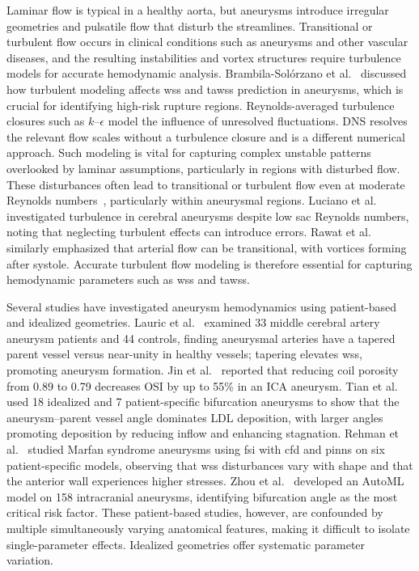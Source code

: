 \documentclass[12pt,a4paper]{article}
\newcommand{\cfdrevision}[1]{#1} %
\newcommand{\CFD}{\ac{cfd}\xspace}
\newcommand{\FSI}{\ac{fsi}\xspace}
\newcommand{\PINNs}{\acp{pinn}\xspace}
\newcommand{\WSS}{\ac{wss}\xspace}
\newcommand{\TAWSS}{\ac{tawss}\xspace}
\newcommand{\OSI}{\ac{OSI}\xspace}
\newcommand{\ICA}{\ac{ICA}\xspace}
\newcommand{\DNS}{\ac{DNS}\xspace}
\newcommand{\LDL}{\ac{LDL}\xspace}
\theoremstyle{definition}
\numberwithin{equation}{section}
\providecommand{\DIFaddtex}[1]{{\protect\color{blue} \sf #1}} %
\providecommand{\DIFdeltex}[1]{{\protect\color{red} \scriptsize #1}} %
\providecommand{\DIFaddbegin}{} %
\providecommand{\DIFaddend}{} %
\providecommand{\DIFdelbegin}{} %
\providecommand{\DIFdelend}{} %
\providecommand{\DIFadd}[1]{\texorpdfstring{\DIFaddtex{#1}}{#1}} %
\providecommand{\DIFdel}[1]{\texorpdfstring{\DIFdeltex{#1}}{}} %
\newcommand{\DIFscaledelfig}{0.5}
\newlength{\DIFdelgraphicswidth} %
\newlength{\DIFdelgraphicsheight} %
\newcommand{\DIFaddincludegraphics}[2][]{{\color{blue}\fbox{\DIFOincludegraphics[#1]{#2}}}} %
\newcommand{\DIFdelincludegraphics}[2][]{%
\sbox{\DIFdelgraphicsbox}{\DIFOincludegraphics[#1]{#2}}%
\settoboxwidth{\DIFdelgraphicswidth}{\DIFdelgraphicsbox} %
\settoboxtotalheight{\DIFdelgraphicsheight}{\DIFdelgraphicsbox} %
\scalebox{\DIFscaledelfig}{%
\parbox[b]{\DIFdelgraphicswidth}{\usebox{\DIFdelgraphicsbox}\\[-\baselineskip] \rule{\DIFdelgraphicswidth}{0em}}\llap{\resizebox{\DIFdelgraphicswidth}{\DIFdelgraphicsheight}{%
\setlength{\unitlength}{\DIFdelgraphicswidth}%
\begin{picture}(1,1)%
\thicklines\linethickness{2pt} %
{\color[rgb]{1,0,0}\put(0,0){\framebox(1,1){}}}%
{\color[rgb]{1,0,0}\put(0,0){\line( 1,1){1}}}%
{\color[rgb]{1,0,0}\put(0,1){\line(1,-1){1}}}%
\end{picture}%
}\hspace*{3pt}}} %
} %
\DeclareRobustCommand{\DIFaddbegin}{\DIFOaddbegin \let\includegraphics\DIFaddincludegraphics} %
\DeclareRobustCommand{\DIFaddend}{\DIFOaddend \let\includegraphics\DIFOincludegraphics} %
\DeclareRobustCommand{\DIFdelbegin}{\DIFOdelbegin \let\includegraphics\DIFdelincludegraphics} %
\DeclareRobustCommand{\DIFdelend}{\DIFOaddend \let\includegraphics\DIFOincludegraphics} %
\renewcommand{\DIFaddtex}[1]{{\protect\color{red}#1}}
\renewcommand{\DIFdeltex}[1]{}
\renewcommand{\DIFdel}[1]{}
\renewcommand{\DIFaddincludegraphics}[2][]{\DIFOincludegraphics[#1]{#2}}
\renewcommand{\DIFdelincludegraphics}[2][]{}
\renewcommand{\cfdrevision}[1]{\textcolor{red}{#1}}
\def\DIFaddbegin{}\def\DIFaddend{}%
\def\DIFdelbegin{}\def\DIFdelend{}%
\def\cfdrevision#1{#1}%
\begin{document}
Laminar flow is typical in a healthy aorta, but aneurysms introduce irregular geometries and pulsatile flow that disturb the streamlines. Transitional or turbulent flow occurs in clinical conditions such as aneurysms and other vascular diseases, and the resulting instabilities and vortex structures require turbulence models for accurate hemodynamic analysis. Brambila-Solórzano et al.~\cite{brambila2023influence} discussed how turbulent modeling affects \WSS and \TAWSS prediction in aneurysms, which is crucial for identifying high-risk rupture regions. \DIFdelbegin \DIFdel{Turbulence models such as $k-\epsilon$ or }%
\DIFdel{resolve chaotic flow structures and better estimate pressure drop, flow separation, and vortex formation. }\DIFdelend \DIFaddbegin \DIFadd{\cfdrevision{Reynolds-averaged turbulence closures such as $k$--$\epsilon$ model the influence of unresolved fluctuations. \DNS resolves the relevant flow scales without a turbulence closure and is a different numerical approach.} }\DIFaddend Such modeling is vital for capturing complex unstable patterns overlooked by laminar assumptions, particularly in regions with disturbed flow. These disturbances often lead to transitional or turbulent flow even at moderate Reynolds numbers~\cite{evju2015assumption}, particularly within aneurysmal regions. Luciano et al.~\cite{luciano2024turbulent} investigated turbulence in cerebral aneurysms despite low sac Reynolds numbers, noting that neglecting turbulent effects can introduce errors. Rawat et al.~\cite{rawat2019numerical} similarly emphasized that arterial flow can be transitional, with vortices forming after systole. Accurate turbulent flow modeling is therefore essential for capturing hemodynamic parameters such as \WSS and \TAWSS.

Several studies have investigated aneurysm hemodynamics using patient-based and idealized geometries. Lauric et al.~\cite{lauric2019proximal} examined 33 middle cerebral artery aneurysm patients and 44 controls, finding aneurysmal arteries have a tapered parent vessel versus near-unity in healthy vessels; tapering elevates \WSS, promoting aneurysm formation. Jin et al.~\cite{jin2023cfd} reported that reducing coil porosity from 0.89 to 0.79 decreases \OSI by up to 55\% in an \ICA aneurysm. Tian et al.~\cite{tian2023influence} used 18 idealized and 7 patient-specific bifurcation aneurysms to show that the aneurysm--parent vessel angle dominates \LDL deposition, with larger angles promoting deposition by reducing inflow and enhancing stagnation. Rehman et al.~\cite{ur2025fluid} studied Marfan syndrome aneurysms using \FSI with \CFD and \PINNs on six patient-specific models, observing that \WSS disturbances vary with shape and that the anterior wall experiences higher stresses. Zhou et al.~\cite{zhou2026morphological} developed an AutoML model on 158 intracranial aneurysms, identifying bifurcation angle as the most critical risk factor. These patient-based studies, however, are confounded by multiple simultaneously varying anatomical features, making it difficult to isolate single-parameter effects. Idealized geometries offer systematic parameter variation.
\end{document}

